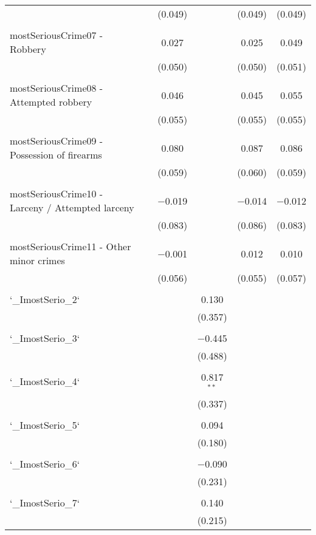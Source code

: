 \documentclass{article}
\begin{document}
\begin{table}[!htbp]
{\begin{tabular}{@{\extracolsep{5pt}}lccccc}
  &  & (0.049) &  & (0.049) & (0.049) \\ 
  & & & & & \\ 
 mostSeriousCrime07 - Robbery &  & 0.027 &  & 0.025 & 0.049 \\ 
  &  & (0.050) &  & (0.050) & (0.051) \\ 
  & & & & & \\ 
 mostSeriousCrime08 - Attempted robbery &  & 0.046 &  & 0.045 & 0.055 \\ 
  &  & (0.055) &  & (0.055) & (0.055) \\ 
  & & & & & \\ 
 mostSeriousCrime09 - Possession of firearms &  & 0.080 &  & 0.087 & 0.086 \\ 
  &  & (0.059) &  & (0.060) & (0.059) \\ 
  & & & & & \\ 
 mostSeriousCrime10 - Larceny / Attempted larceny &  & $-$0.019 &  & $-$0.014 & $-$0.012 \\ 
  &  & (0.083) &  & (0.086) & (0.083) \\ 
  & & & & & \\ 
 mostSeriousCrime11 - Other minor crimes &  & $-$0.001 &  & 0.012 & 0.010 \\ 
  &  & (0.056) &  & (0.055) & (0.057) \\ 
  & & & & & \\ 
 `\_ImostSerio\_2` &  &  & 0.130 &  &  \\ 
  &  &  & (0.357) &  &  \\ 
  & & & & & \\ 
 `\_ImostSerio\_3` &  &  & $-$0.445 &  &  \\ 
  &  &  & (0.488) &  &  \\ 
  & & & & & \\ 
 `\_ImostSerio\_4` &  &  & 0.817$^{**}$ &  &  \\ 
  &  &  & (0.337) &  &  \\ 
  & & & & & \\ 
 `\_ImostSerio\_5` &  &  & 0.094 &  &  \\ 
  &  &  & (0.180) &  &  \\ 
  & & & & & \\ 
 `\_ImostSerio\_6` &  &  & $-$0.090 &  &  \\ 
  &  &  & (0.231) &  &  \\ 
  & & & & & \\ 
 `\_ImostSerio\_7` &  &  & 0.140 &  &  \\ 
  &  &  & (0.215) &  &  \\ 

\end{tabular}}
\end{table}
\end{document}
